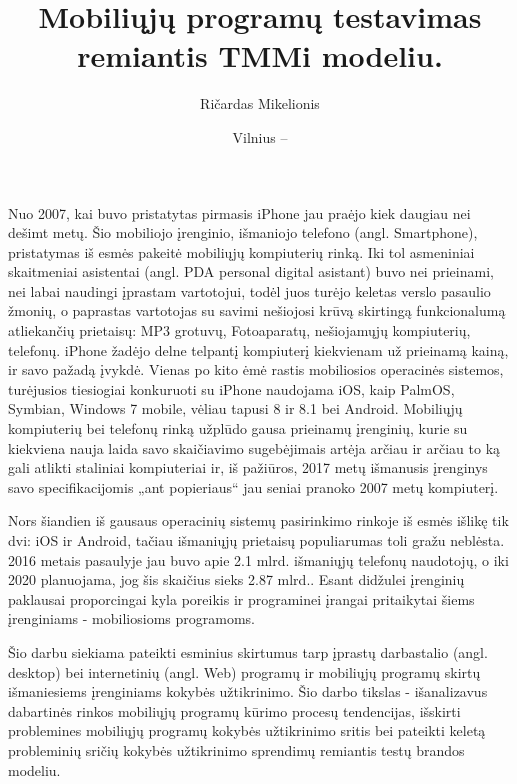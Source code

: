 \documentclass{VUMIFPSkursinis}
\title{Mobiliųjų programų testavimas remiantis TMMi modeliu.}
\author{Ričardas Mikelionis}
\date{Vilnius – \the\year}
\begin{document}
\maketitle

\cleardoublepage
{}
\tableofcontents
\cleardoublepage
{}

Nuo 2007, kai buvo pristatytas pirmasis iPhone jau praėjo kiek daugiau nei dešimt metų. Šio mobiliojo įrenginio, išmaniojo telefono (angl. Smartphone), pristatymas  iš esmės pakeitė mobiliųjų kompiuterių rinką. Iki tol asmeniniai skaitmeniai asistentai (angl. PDA personal digital asistant) buvo nei prieinami, nei labai naudingi įprastam vartotojui, todėl juos turėjo keletas verslo pasaulio žmonių, o paprastas vartotojas su savimi nešiojosi krūvą skirtingą funkcionalumą atliekančių prietaisų: MP3 grotuvų, Fotoaparatų, nešiojamųjų kompiuterių, telefonų. iPhone žadėjo delne telpantį kompiuterį kiekvienam už prieinamą kainą, ir savo pažadą įvykdė. Vienas po kito ėmė rastis  mobiliosios operacinės sistemos, turėjusios tiesiogiai konkuruoti su iPhone naudojama iOS,  kaip PalmOS, Symbian, Windows 7 mobile, vėliau tapusi 8 ir 8.1 bei Android. Mobiliųjų kompiuterių bei telefonų rinką užplūdo gausa prieinamų įrenginių, kurie su kiekviena nauja laida savo skaičiavimo sugebėjimais artėja arčiau ir arčiau to ką gali atlikti staliniai kompiuteriai ir, iš pažiūros, 2017 metų išmanusis įrenginys savo specifikacijomis „ant popieriaus“ jau seniai pranoko 2007 metų kompiuterį.

Nors šiandien iš gausaus operacinių sistemų pasirinkimo rinkoje iš esmės išlikę tik dvi: iOS ir Android, tačiau  išmaniųjų prietaisų populiarumas toli gražu neblėsta. 2016 metais pasaulyje jau buvo apie 2.1 mlrd. išmaniųjų telefonų naudotojų, o iki 2020 planuojama, jog šis skaičius sieks 2.87 mlrd.\cite {statista.com}. Esant didžulei įrenginių paklausai proporcingai kyla poreikis ir programinei įrangai pritaikytai šiems įrenginiams - mobiliosioms programoms.

Šio darbu siekiama pateikti esminius skirtumus tarp įprastų darbastalio (angl. desktop) bei internetinių (angl. Web) programų ir mobiliųjų programų skirtų išmaniesiems įrenginiams kokybės užtikrinimo. Šio darbo tikslas - išanalizavus dabartinės rinkos mobiliųjų programų kūrimo procesų tendencijas, išskirti problemines mobiliųjų programų kokybės užtikrinimo sritis bei pateikti keletą probleminių sričių kokybės užtikrinimo sprendimų remiantis testų brandos modeliu.
\end{document}
